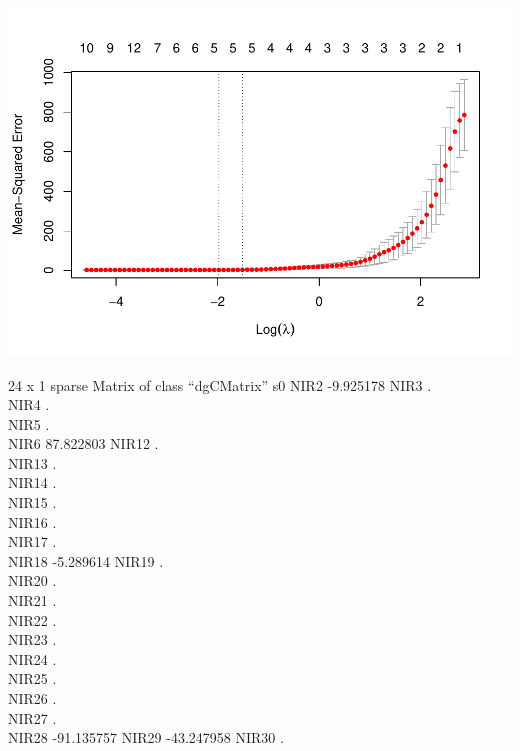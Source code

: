 \documentclass[
]{article}
\newenvironment{Shaded}{\begin{snugshade}}{\end{snugshade}}
\newcommand{\AttributeTok}[1]{\textcolor[rgb]{0.77,0.63,0.00}{#1}}
\newcommand{\DecValTok}[1]{\textcolor[rgb]{0.00,0.00,0.81}{#1}}
\newcommand{\FloatTok}[1]{\textcolor[rgb]{0.00,0.00,0.81}{#1}}
\newcommand{\FunctionTok}[1]{\textcolor[rgb]{0.00,0.00,0.00}{#1}}
\newcommand{\NormalTok}[1]{#1}
\newcommand{\OtherTok}[1]{\textcolor[rgb]{0.56,0.35,0.01}{#1}}
\newcommand{\SpecialCharTok}[1]{\textcolor[rgb]{0.00,0.00,0.00}{#1}}
\begin{document}
\includegraphics{Taller-2-Regresion-Multiple-Aplicada_files/figure-latex/unnamed-chunk-7-1.pdf}

\begin{Shaded}
\end{Shaded}

24 x 1 sparse Matrix of class ``dgCMatrix'' s0 NIR2 -9.925178 NIR3 .\\
NIR4 .\\
NIR5 .\\
NIR6 87.822803 NIR12 .\\
NIR13 .\\
NIR14 .\\
NIR15 .\\
NIR16 .\\
NIR17 .\\
NIR18 -5.289614 NIR19 .\\
NIR20 .\\
NIR21 .\\
NIR22 .\\
NIR23 .\\
NIR24 .\\
NIR25 .\\
NIR26 .\\
NIR27 .\\
NIR28 -91.135757 NIR29 -43.247958 NIR30 .
\end{document}
